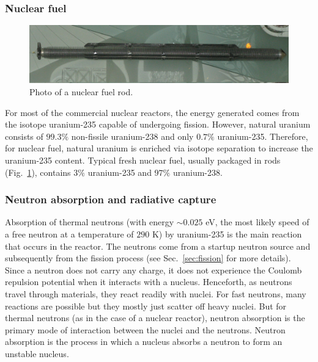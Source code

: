 \documentclass[nofootinbib,preprint,aps]{revtex4-1}
\begin{document}
    \subsubsection{Nuclear fuel}
        \begin{figure}
            \centering
            \includegraphics[width=\textwidth]{rod.jpg}
            \caption{Photo of a nuclear fuel rod.\cite{rodpic}}
            \label{fig:rod}
        \end{figure}
    For most of the commercial nuclear reactors, the energy generated comes from the isotope uranium-235 capable
    of undergoing fission.
    However, natural uranium consists of $99.3\%$
    non-fissile uranium-238 and only $0.7\%$ uranium-235. Therefore, for nuclear fuel, natural uranium is enriched
    via isotope separation to increase the uranium-235 content. Typical fresh nuclear fuel, usually packaged in
    rods (Fig.~\ref{fig:rod}), contains $3\%$ uranium-235 and $97\%$ uranium-238.

    \subsubsection{Neutron absorption and radiative capture}
    \label{sec:capture}
    Absorption of thermal neutrons (with energy $\sim 0.025$ eV, the most likely speed of a free neutron at 
    a temperature of $290$ K) by uranium-235 is the main reaction that
    occurs in the reactor. The neutrons come from a startup neutron source and subsequently from the fission
    process (see Sec.~\ref{sec:fission} for more details).
    Since a neutron does not carry any charge, it does not experience the Coulomb repulsion potential when
    it interacts
    with a nucleus.
    Henceforth, as neutrons travel through materials, they react readily with nuclei.
    For fast neutrons, many reactions are possible but they mostly just scatter off heavy nuclei.
    But for thermal neutrons (as in the case of a nuclear reactor), neutron absorption
    is the primary mode of interaction between the nuclei and the neutrons.
    Neutron absorption is the process in which a nucleus absorbs a neutron to form an unstable
    nucleus.
\end{document}
